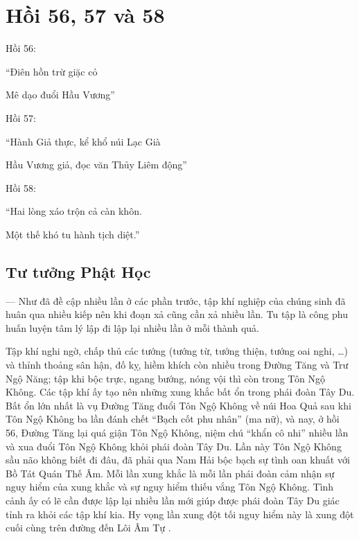 \chapter{Hồi 56, 57 và 58} %
\label{cha:hoi_56_57}

Hồi 56:

\begin{itshape}
``Điên hồn trừ giặc cỏ

Mê dạo đuổi Hầu Vương''
\end{itshape}

Hồi 57:

\begin{itshape}
``Hành Giả thực, kể khổ núi Lạc Già

Hầu Vương giả, đọc văn Thủy Liêm động''
\end{itshape}

Hồi 58:

\begin{itshape}
``Hai lòng xáo trộn cả càn khôn.

Một thế khó tu hành tịch diệt.''
\end{itshape}

\section{Tư tưởng Phật Học} %
\label{sec:56_57_phat_hoc}

— Như đã đề cập nhiều lần ở các phần trước, tập khí nghiệp của chúng sinh đã huân qua nhiều kiếp nên khi đoạn xả cũng cần xả nhiều lần. Tu tập là công phu huấn luyện tâm lý lập đi lập lại nhiều lần ở mỗi thành quả.

Tập khí nghi ngờ, chấp thủ các tướng (tướng từ, tướng thiện, tướng oai nghi, \ldots) và thỉnh thoảng sân hận, đố kỵ, hiềm khích còn nhiều trong Đường Tăng và Trư Ngộ Năng; tập khi bộc trực, ngang bướng, nóng vội thì còn trong Tôn Ngộ Không. Các tập khí ấy tạo nên những xung khắc bất ổn trong phái đoàn Tây Du. Bất ổn lớn nhất là vụ Đường Tăng đuổi Tôn Ngộ Không về núi Hoa Quả sau khi Tôn Ngộ Không ba lần đánh chết ``Bạch cốt phu nhân'' (ma nữ), và nay, ở hồi 56, Đường Tăng lại quá giận Tôn Ngộ Không, niệm chú ``khẩn cô nhi'' nhiều lần và xua đuổi Tôn Ngộ Không khỏi phái đoàn Tây Du. Lần này Tôn Ngộ Không sầu não không biết đi đâu, đã phải qua Nam Hải bộc bạch sự tình oan khuất với Bồ Tát Quán Thế Âm. Mỗi lần xung khắc là mỗi lần phái đoàn cảm nhận sự nguy hiểm của xung khắc và sự nguy hiểm thiếu vắng Tôn Ngộ Không. Tình cảnh ấy có lẽ cần được lập lại nhiều lần mới giúp được phái đoàn Tây Du giác tỉnh ra khỏi các tập khí kia. Hy vọng lần xung đột tối nguy hiểm này là xung đột cuối cùng trên đường đến Lôi Âm Tự .

